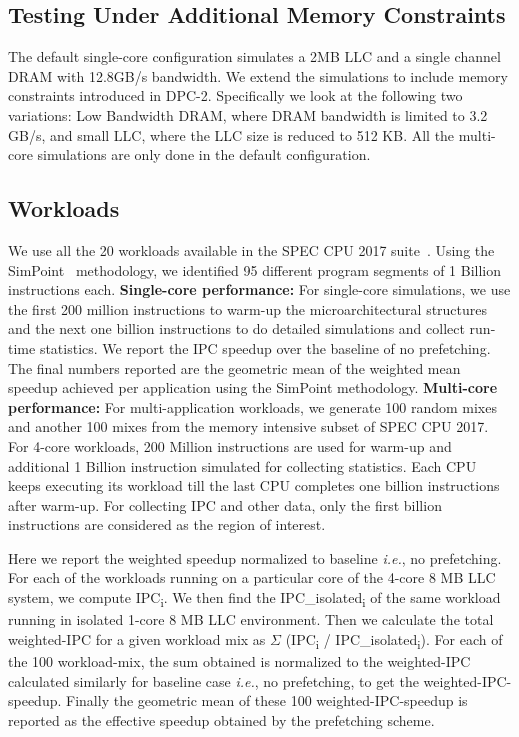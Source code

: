\subsection{Testing Under Additional Memory Constraints}
\label{Method-AdditionalMem}
The default single-core configuration simulates a 2MB LLC and a single
channel DRAM with 12.8GB/s bandwidth. We extend the simulations to
include memory constraints introduced in DPC-2. Specifically we look
at the following two variations: Low Bandwidth DRAM, where DRAM
bandwidth is limited to 3.2 GB/s, and small LLC, where the LLC size is
reduced to 512 KB.  All the multi-core simulations are only done in
the default configuration.

\subsection{Workloads}
\label{Method-Workloads}

We use all the 20 workloads available in the SPEC CPU 2017
suite~\cite{SPEC2017}. Using the SimPoint~\cite{SimPoint} methodology,
we identified 95 different program segments of 1 Billion
instructions each.
\newline
\newline
\noindent \textbf{Single-core performance:} For single-core
simulations, we use the first 200 million instructions to warm-up the
microarchitectural structures and the next one billion instructions to
do detailed simulations and collect run-time statistics. We report the
IPC speedup over the baseline of no prefetching.  The final numbers
reported are the geometric mean of the weighted mean speedup achieved
per application using the SimPoint methodology.
\newline
\newline
\noindent \textbf{Multi-core performance:} For multi-application
workloads, we generate 100 random mixes and another 100 mixes from the
memory intensive subset of SPEC CPU 2017.  For 4-core workloads, 200
Million instructions are used for warm-up and additional 1 Billion
instruction simulated for collecting statistics.  Each CPU keeps
executing its workload till the last CPU completes one billion
instructions after warm-up.  For collecting IPC and other data, only
the first billion instructions are considered as the region of
interest.

Here we report the weighted speedup normalized to baseline
\textit{i.e.}, no prefetching. For each of the workloads running on a
particular core of the 4-core 8 MB LLC system, we compute
IPC\textsubscript{i}. We then find the IPC\_isolated\textsubscript{i}
of the same workload running in isolated 1-core 8 MB LLC environment.
Then we calculate the total weighted-IPC for a given workload mix as
$\Sigma$ (IPC\textsubscript{i} / IPC\_isolated\textsubscript{i}). For
each of the 100 workload-mix, the sum obtained is normalized to the
weighted-IPC calculated similarly for baseline case \textit{i.e.}, no
prefetching, to get the weighted-IPC-speedup. Finally the geometric
mean of these 100 weighted-IPC-speedup is reported as the effective
speedup obtained by the prefetching scheme.

